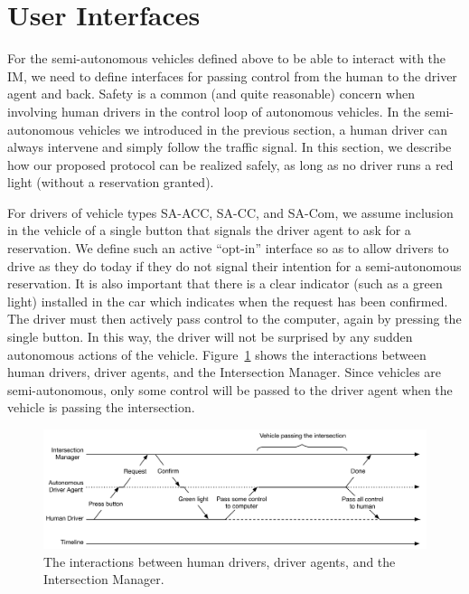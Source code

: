 \section{User Interfaces}
\label{sec:interface}

For the semi-autonomous vehicles defined above to be able to interact
with the IM, we need to define interfaces for passing control from the
human to the driver agent and back.  Safety is a common (and quite
reasonable) concern when involving human drivers in the control loop
of autonomous vehicles.  In the semi-autonomous vehicles we introduced
in the previous section, a human driver can always intervene and
simply follow the traffic signal. In this section, we describe how our
proposed protocol can be realized safely, as long as no driver runs a
red light (without a reservation granted).

For drivers of vehicle types SA-ACC, SA-CC, and SA-Com, we assume
inclusion in the vehicle of a single button that signals the driver
agent to ask for a reservation.  We define such an active ``opt-in''
interface so as to allow drivers to drive as they do today if they do
not signal their intention for a semi-autonomous reservation.  It is
also important that there is a clear indicator (such as a green light)
installed in the car which indicates when the request has been
confirmed.  The driver must then actively pass control to the
computer, again by pressing the single button.  In this way, the
driver will not be surprised by any sudden autonomous actions of the
vehicle.  Figure~\ref{fig:interaction} shows the interactions between
human drivers, driver agents, and the Intersection Manager.
Since vehicles are semi-autonomous, only some control will be passed
to the driver agent when the vehicle is passing the intersection.

\begin{figure}[t]
\centering
\includegraphics[width=\columnwidth]{figures/interaction}
\caption{The interactions between human drivers, driver agents, and
the Intersection Manager.}
\label{fig:interaction}
\end{figure}


